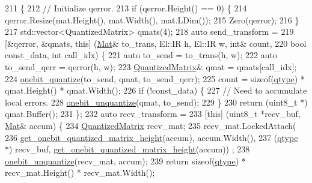 \begin{DoxyCode}
211                                            \{
212   \textcolor{comment}{// Initialize qerror.}
213   \textcolor{keywordflow}{if} (qerror.Height() == 0) \{
214     qerror.Resize(mat.Height(), mat.Width(), mat.LDim());
215     Zero(qerror);
216   \}
217   std::vector<QuantizedMatrix> qmats(4);
218   \textcolor{keyword}{auto} send\_transform =
219     [&qerror, &qmats, \textcolor{keyword}{this}] (\hyperlink{base_8hpp_a68f11fdc31b62516cb310831bbe54d73}{Mat}& to\_trans, El::IR h, El::IR w, \textcolor{keywordtype}{int}& count,
220                              \textcolor{keywordtype}{bool} const\_data, \textcolor{keywordtype}{int} call\_idx) \{
221     \textcolor{keyword}{auto} to\_send = to\_trans(h, w);
222     \textcolor{keyword}{auto} to\_send\_qerr = qerror(h, w);
223     \hyperlink{classlbann_1_1lbann__quantizer_a399f3f8c393b6021b43e95d1ce6ea28c}{QuantizedMatrix}& qmat = qmats[call\_idx];
224     \hyperlink{classlbann_1_1lbann__quantizer_a4dd4696cbbfd93c73e5fb3c40fcb16c3}{onebit\_quantize}(to\_send, qmat, to\_send\_qerr);
225     count = \textcolor{keyword}{sizeof}(\hyperlink{classlbann_1_1lbann__quantizer_afcda642ff1b44d31eec910909c3d013e}{qtype}) * qmat.Height() * qmat.Width();
226     \textcolor{keywordflow}{if} (!const\_data) \{
227       \textcolor{comment}{// Need to accumulate local errors.}
228       \hyperlink{classlbann_1_1lbann__quantizer_ad5592daa122b40c275cce3dc93bba41e}{onebit\_unquantize}(qmat, to\_send);
229     \}
230     \textcolor{keywordflow}{return} (uint8\_t *) qmat.Buffer();
231   \};
232   \textcolor{keyword}{auto} recv\_transform =
233   [\textcolor{keyword}{this}] (uint8\_t *recv\_buf, \hyperlink{base_8hpp_a68f11fdc31b62516cb310831bbe54d73}{Mat}& accum) \{
234     \hyperlink{classlbann_1_1lbann__quantizer_a399f3f8c393b6021b43e95d1ce6ea28c}{QuantizedMatrix} recv\_mat;
235     recv\_mat.LockedAttach(
236       \hyperlink{classlbann_1_1lbann__quantizer_aa1541b9afa60250dbd570acbbe98242f}{get\_onebit\_quantized\_matrix\_height}(accum), accum.Width(),
237       (\hyperlink{classlbann_1_1lbann__quantizer_afcda642ff1b44d31eec910909c3d013e}{qtype} *) recv\_buf, \hyperlink{classlbann_1_1lbann__quantizer_aa1541b9afa60250dbd570acbbe98242f}{get\_onebit\_quantized\_matrix\_height}(accum))
      ;
238     \hyperlink{classlbann_1_1lbann__quantizer_ad5592daa122b40c275cce3dc93bba41e}{onebit\_unquantize}(recv\_mat, accum);
239     \textcolor{keywordflow}{return} \textcolor{keyword}{sizeof}(\hyperlink{classlbann_1_1lbann__quantizer_afcda642ff1b44d31eec910909c3d013e}{qtype}) * recv\_mat.Height() * recv\_mat.Width();

\end{DoxyCode}
